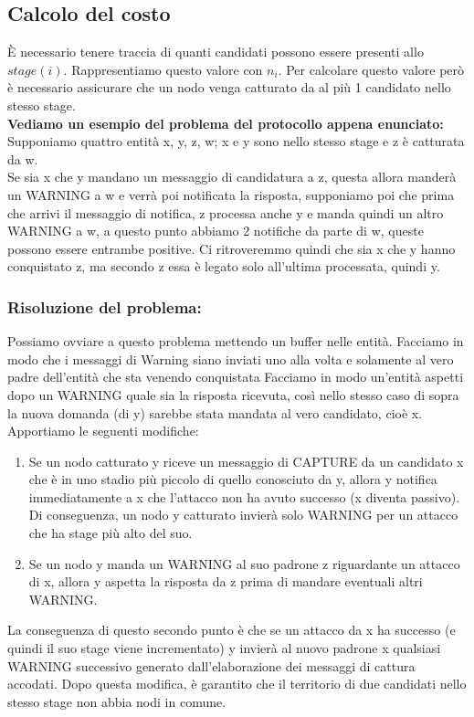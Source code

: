 \subsection{Calcolo del costo}
È necessario tenere traccia di quanti candidati possono essere presenti allo
$stage(i)$. Rappresentiamo questo valore con $n_i$. Per calcolare questo valore
però è necessario assicurare che un nodo venga catturato da al più 1 candidato
nello stesso stage.\\
\textbf{Vediamo un esempio del problema del protocollo appena enunciato:}\\
Supponiamo quattro entità x, y, z, w; x e y sono nello stesso stage e z è
catturata da w.\\
Se sia x che y mandano un messaggio di candidatura a z, questa allora manderà un
WARNING a w e verrà poi notificata la risposta, supponiamo poi che prima che
arrivi il messaggio di notifica, z processa anche y e manda quindi un altro
WARNING a w, a questo punto abbiamo 2 notifiche da parte di w, queste possono
essere entrambe positive. Ci ritroveremmo quindi che sia x che y hanno
conquistato z, ma secondo z essa è legato solo all'ultima processata, quindi
y.\\
\subsubsection{Risoluzione del problema:}
Possiamo ovviare a questo problema mettendo un buffer nelle entità. Facciamo in
modo che i messaggi di Warning siano inviati uno alla volta e solamente al vero
padre dell'entità che sta venendo conquistata Facciamo in modo un'entità aspetti
dopo un WARNING quale sia la risposta ricevuta, così nello stesso caso di sopra
la nuova domanda (di y) sarebbe stata mandata al vero candidato, cioè x.\\
Apportiamo le seguenti modifiche:
\begin{enumerate}
    \item Se un nodo catturato y riceve un messaggio di CAPTURE da un candidato x
          che è in uno stadio più piccolo di quello conosciuto da y, allora y notifica
          immediatamente a x che l'attacco non ha avuto successo (x diventa passivo). Di
          conseguenza, un nodo y catturato invierà solo WARNING per un attacco che ha
          stage più alto del suo.
    \item Se un nodo y manda un WARNING al suo padrone z riguardante un attacco di
          x, allora y aspetta la risposta da z prima di mandare eventuali altri WARNING.
\end{enumerate}
La conseguenza di questo secondo punto è che se un attacco da x ha successo (e
quindi il suo stage viene incrementato) y invierà al nuovo padrone x qualsiasi
WARNING successivo generato dall'elaborazione dei messaggi di cattura accodati.
Dopo questa modifica, è garantito che il territorio di due candidati nello
stesso stage non abbia nodi in comune.\\

